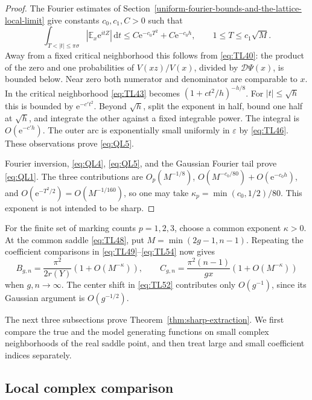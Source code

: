 \begin{proof}
The Fourier estimates of Section~\ref{uniform-fourier-bounds-and-the-lattice-local-limit}
give constants $c_0,c_1,C>0$ such that
\begin{equation}
 \int_{T<|t|\le\pi\sigma}|\mathbb E_x \mathrm{e}^{itZ}|\,\mathrm{d}t
 \le C\mathrm{e}^{-c_0T^2}+C\mathrm{e}^{-c_0h},\qquad 1\le T\le c_1\sqrt M.
 \label{eq:QL5}
\end{equation}
Away from a fixed critical neighborhood this follows from
\eqref{eq:TL40}: the product of the zero and one probabilities of
$V(xz)/V(x)$, divided by $\mathscr D\Psi(x)$, is bounded below.
Near zero both numerator and denominator are comparable to $x$.
In the critical neighborhood \eqref{eq:TL43} becomes
$(1+c t^2/h)^{-h/8}$. For $|t|\le\sqrt h$ this is bounded by
$\mathrm{e}^{-c't^2}$. Beyond $\sqrt h$, split the exponent in half, bound
one half at $\sqrt h$, and integrate the other against a fixed
integrable power. The integral is $O(\mathrm{e}^{-c'h})$.
The outer arc is exponentially small uniformly in $\varepsilon$ by
\eqref{eq:TL46}. These observations prove \eqref{eq:QL5}.

Fourier inversion, \eqref{eq:QL4}, \eqref{eq:QL5}, and the Gaussian
Fourier tail prove \eqref{eq:QL1}. The three contributions are
$O_p(M^{-1/8})$, $O(M^{-c_0/80})+O(\mathrm{e}^{-c_0h})$, and
$O(\mathrm{e}^{-T^2/2})=O(M^{-1/160})$, so one may take
$\kappa_p=\min(c_0,1/2)/80$. This exponent is not intended to be sharp.
\end{proof}

For the finite set of marking counts $p=1,2,3$, choose a common exponent
$\kappa>0$. At the common saddle \eqref{eq:TL48}, put
$M=\min(2g-1,n-1)$. Repeating the coefficient comparisons in
\eqref{eq:TL49}--\eqref{eq:TL54} now gives
\begin{equation}
 B_{g,n}=\frac{\pi^2}{2r(Y)}(1+O(M^{-\kappa})),\qquad
 C_{g,n}=\frac{\pi^2(n-1)}{gx}(1+O(M^{-\kappa}))
 \label{eq:QL6}
\end{equation}
when $g,n\to\infty$. The center shift in \eqref{eq:TL52} contributes
only $O(g^{-1})$, since its Gaussian argument is $O(g^{-1/2})$.


The next three subsections prove Theorem~\ref{thm:sharp-extraction}. We
first compare the true and the model generating functions on small
complex neighborhoods of the real saddle point, and then treat large
and small coefficient indices separately.

\subsection{Local complex comparison}\label{app:local-complex}

